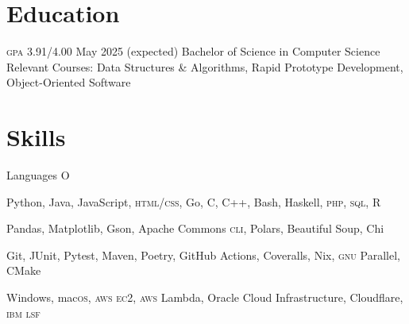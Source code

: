 \section{Education}
\begin{doutline}
     \textsc{gpa} 3.91/4.00
    \hfill May 2025 (expected)
        \2 Bachelor of Science in Computer Science
        \2 Relevant Courses: Data Structures \& Algorithms, Rapid Prototype Development, Object-Oriented Software
\end{doutline}

\section{Skills}
\begin{labeling}{Languages O}
    \item [Languages] Python, Java, JavaScript, \textsc{html/css}, Go, C, C++, Bash, Haskell, \textsc{php}, \textsc{sql}, R
    \item [Libraries] Pandas, Matplotlib, Gson, Apache Commons \textsc{cli}, Polars, Beautiful Soup, Chi
    \item [Tools] Git, JUnit, Pytest, Maven, Poetry, GitHub Actions, Coveralls, Nix, \textsc{gnu} Parallel, CMake
    \item [Platforms] Windows, mac\textsc{os}, \textsc{aws ec2}, \textsc{aws} Lambda, Oracle Cloud Infrastructure, Cloudflare, \textsc{ibm lsf}
\end{labeling}

